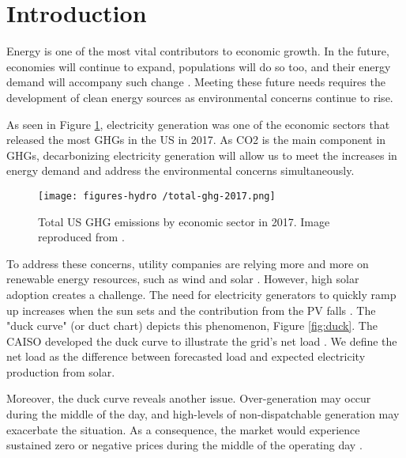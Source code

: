 \documentclass[11pt,letterpaper]{article}
\begin{document}

\section{Introduction}

Energy is one of the most vital contributors to economic growth.
In the future, economies will continue to expand, populations will do so too, and their energy demand will accompany such change \cite{burke_impact_2018} \cite{el-shafie_hydrogen_2019}.
Meeting these future needs requires the development of clean energy sources as environmental concerns continue to rise.

As seen in Figure \ref{fig:ghg}, electricity generation was one of the economic sectors that released the most \glspl{GHG} in the \gls{US} in 2017.
As \gls{CO2} is the main component in \glspl{GHG}, decarbonizing electricity generation will allow us to meet the increases in energy demand and address the environmental concerns simultaneously.

\begin{figure}[htbp!]
	\centering
	\texttt{[image: figures-hydro /total-ghg-2017.png]}
	\hfill
	\caption{Total \gls{US} \gls{GHG} emissions by economic sector in 2017. Image reproduced from \cite{us_epa_sources_2020}.}
	\label{fig:ghg}
\end{figure}

To address these concerns, utility companies are relying more and more on renewable energy resources, such as wind and solar \cite{ming_resource_2019}.
However, high solar adoption creates a challenge.
The need for electricity generators to quickly ramp up increases when the sun sets and the contribution from the \gls{PV} falls \cite{us_department_of_energy_confronting_2017}.
The "duck curve" (or duct chart) depicts this phenomenon, Figure \ref{fig:duck}.
The \gls{CAISO} developed the duck curve to illustrate the grid's net load \cite{bouillon_prepared_2014}.
We define the net load as the difference between forecasted load and expected electricity production from solar.

Moreover, the duck curve reveals another issue.
Over-generation may occur during the middle of the day, and high-levels of non-dispatchable generation may exacerbate the situation.
As a consequence, the market would experience sustained zero or negative prices during the middle of the operating day \cite{bouillon_prepared_2014}.
\end{document}
